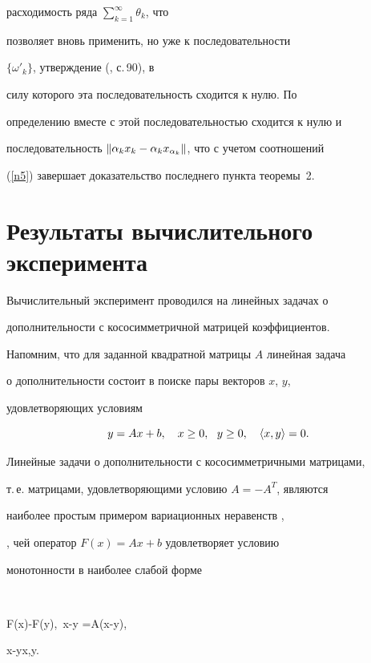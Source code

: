 \begin{pf}
расходимость ряда $\sum\limits_{k=1}^{\infty}\theta_k$, что


позволяет вновь применить, но уже к последовательности


$\{\omega'_k\}$, утверждение (\cite{vasil}, с.\,90), в


силу которого эта последовательность сходится к нулю. По


определению вместе с этой последовательностью сходится к нулю и


последовательность $\|\alpha_k x_k-\alpha_kx_{\alpha_k}\|$, что с учетом соотношений


(\ref{n5}) завершает доказательство последнего пункта теоремы~2.


\end{pf}








\section{Результаты вычислительного эксперимента}





Вычислительный эксперимент проводился на линейных задачах о


дополнительности с кососимметричной матрицей коэффициентов.


Напомним, что для заданной квадратной матрицы $A$ линейная задача


о дополнительности состоит в поиске пары векторов $x$, $y$,


удовлетворяющих условиям


$$


y=Ax+b,\quad x\geq0,\ \ y\geq0,\quad \lft x,y\rgt=0.


$$


Линейные задачи о дополнительности с кососимметричными матрицами,


т.\,е. матрицами, удовлетворяющими условию $A=-A^T$, являются


наиболее простым примером вариационных неравенств \cite{kinder},


\cite{png}, чей оператор $F(x)=Ax+b$ удовлетворяет условию


монотонности в наиболее слабой форме


$$


\lft F(x)-F(y),\ x-y \rgt=\lft A(x-y),


x-y\quad\forall x,y.


